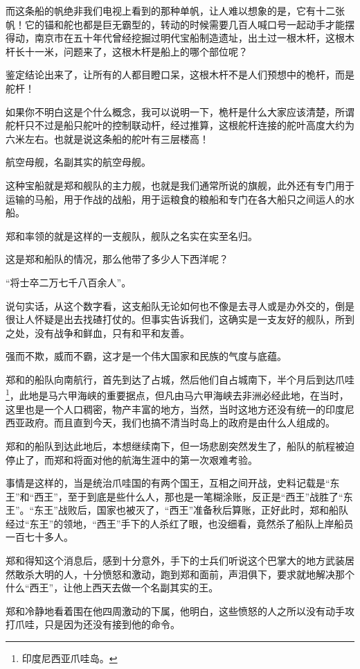 \begin{multicols}{\theparacolNo}
而这条船的帆绝非我们电视上看到的那种单帆，让人难以想象的是，它有十二张帆！它的锚和舵也都是巨无霸型的，转动的时候需要几百人喊口号一起动手才能摆得动，南京市在五十年代曾经挖掘过明代宝船制造遗址，出土过一根木杆，这根木杆长十一米，问题来了，这根木杆是船上的哪个部位呢？

鉴定结论出来了，让所有的人都目瞪口呆，这根木杆不是人们预想中的桅杆，而是舵杆！

如果你不明白这是个什么概念，我可以说明一下，桅杆是什么大家应该清楚，所谓舵杆只不过是船只舵叶的控制联动杆，经过推算，这根舵杆连接的舵叶高度大约为六米左右。也就是说这条船的舵叶有三层楼高！

航空母舰，名副其实的航空母舰。

这种宝船就是郑和舰队的主力舰，也就是我们通常所说的旗舰，此外还有专门用于运输的马船，用于作战的战船，用于运粮食的粮船和专门在各大船只之间运人的水船。

郑和率领的就是这样的一支舰队，舰队之名实在实至名归。

这是郑和船队的情况，那么他带了多少人下西洋呢？

“将士卒二万七千八百余人”。

说句实话，从这个数字看，这支船队无论如何也不像是去寻人或是办外交的，倒是很让人怀疑是出去找碴打仗的。但事实告诉我们，这确实是一支友好的舰队，所到之处，没有战争和鲜血，只有和平和友善。

强而不欺，威而不霸，这才是一个伟大国家和民族的气度与底蕴。

郑和的船队向南航行，首先到达了占城，然后他们自占城南下，半个月后到达爪哇\footnote{印度尼西亚爪哇岛。}，此地是马六甲海峡的重要据点，但凡由马六甲海峡去非洲必经此地，在当时，这里也是一个人口稠密，物产丰富的地方，当然，当时这地方还没有统一的印度尼西亚政府。而且直到今天，我们也搞不清当时岛上的政府是由什么人组成的。

郑和的船队到达此地后，本想继续南下，但一场悲剧突然发生了，船队的航程被迫停止了，而郑和将面对他的航海生涯中的第一次艰难考验。

事情是这样的，当是统治爪哇国的有两个国王，互相之间开战，史料记载是“东王”和“西王”，至于到底是些什么人，那也是一笔糊涂账，反正是“西王”战胜了“东王”。“东王”战败后，国家也被灭了，“西王”准备秋后算账，正好此时，郑和船队经过“东王”的领地，“西王”手下的人杀红了眼，也没细看，竟然杀了船队上岸船员一百七十多人。

郑和得知这个消息后，感到十分意外，手下的士兵们听说这个巴掌大的地方武装居然敢杀大明的人，十分愤怒和激动，跑到郑和面前，声泪俱下，要求就地解决那个什么“西王”，让他上西天去做一个名副其实的王。

郑和冷静地看着围在他四周激动的下属，他明白，这些愤怒的人之所以没有动手攻打爪哇，只是因为还没有接到他的命令。


\end{multicols}
